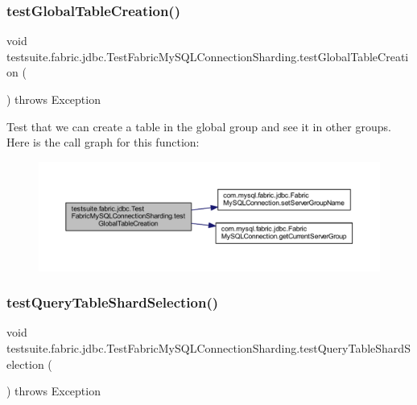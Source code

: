\subsubsection{\texorpdfstring{test\+Global\+Table\+Creation()}{testGlobalTableCreation()}}
{\footnotesize\ttfamily void testsuite.\+fabric.\+jdbc.\+Test\+Fabric\+My\+S\+Q\+L\+Connection\+Sharding.\+test\+Global\+Table\+Creation (\begin{DoxyParamCaption}{ }\end{DoxyParamCaption}) throws Exception}

Test that we can create a table in the global group and see it in other groups. Here is the call graph for this function\+:
\nopagebreak
\begin{figure}[H]
\begin{center}
\leavevmode
\includegraphics[width=350pt]{classtestsuite_1_1fabric_1_1jdbc_1_1_test_fabric_my_s_q_l_connection_sharding_aad69b31b22180ecde905f79c6819070a_cgraph}
\end{center}
\end{figure}
\mbox{\label{classtestsuite_1_1fabric_1_1jdbc_1_1_test_fabric_my_s_q_l_connection_sharding_a8cdda6c1764cfbd5d3fe85d9c671c346}} 
\subsubsection{\texorpdfstring{test\+Query\+Table\+Shard\+Selection()}{testQueryTableShardSelection()}}
{\footnotesize\ttfamily void testsuite.\+fabric.\+jdbc.\+Test\+Fabric\+My\+S\+Q\+L\+Connection\+Sharding.\+test\+Query\+Table\+Shard\+Selection (\begin{DoxyParamCaption}{ }\end{DoxyParamCaption}) throws Exception}

